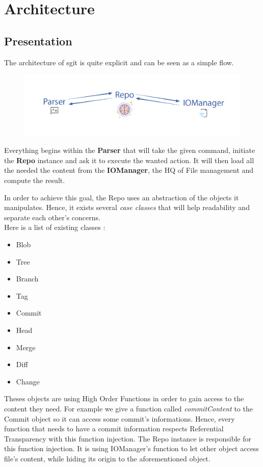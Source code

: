 \documentclass[11pt]{article}
\begin{document}
\section{Architecture}
\subsection{Presentation}
The architecture of sgit is quite explicit and can be seen as a simple flow.

\begin{figure}[h!]
  \centering
  \includegraphics[width=\linewidth]{img/flow.png}
\end{figure}

Everything begins within the \textbf{Parser} that will take the given command, initiate the \textbf{Repo} instance and ask it to execute the wanted action. It will then load all the needed the content from the \textbf{IOManager}, the HQ of File management and compute the result.

In order to achieve this goal, the Repo uses an abstraction of the objects it manipulates. Hence, it exists several \textit{case classes} that will help readability and separate each other's concerns.\\

Here is a list of existing classes :
\begin{multicols}{3}
\begin{itemize}
  \setlength\itemsep{0.1em}
  \item Blob
  \item Tree
  \item Branch
  \item Tag
  \item Commit
  \item Head
  \item Merge
  \item Diff
  \item Change
\end{itemize}
\end{multicols}

Theses objects are using High Order Functions in order to gain access to the content they need. For example we give a function called \textit{commitContent} to the Commit object so it can access some commit's informations. Hence, every function that needs to have a commit information respects Referential Transparency with this function injection.
The Repo instance is responsible for this function injection. It is using IOManager's function to let other object access file's content, while hiding its origin to the aforementioned object.
\end{document}
